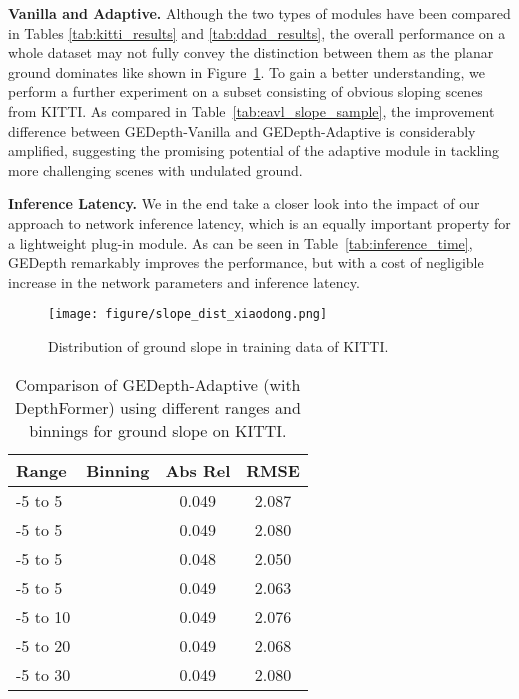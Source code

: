 \documentclass[10pt,twocolumn,letterpaper]{article}
\begin{document}
\noindent\textbf{Vanilla and Adaptive.} 
Although the two types of modules have been compared in Tables \ref{tab:kitti_results} and \ref{tab:ddad_results}, the overall performance on a whole dataset may not fully convey the distinction between them as the planar ground dominates like shown in Figure~\ref{fig:slope_dist}. To gain a better understanding, we perform a further experiment on a subset consisting of obvious sloping scenes from KITTI. As compared in Table~\ref{tab:eavl_slope_sample}, the improvement difference between GEDepth-Vanilla and GEDepth-Adaptive is considerably amplified, suggesting the promising potential of the adaptive module in tackling more challenging scenes with undulated ground.  

\noindent\textbf{Inference Latency.}  
We in the end take a closer look into the impact of our approach to network inference latency, which is an equally important property for a lightweight plug-in module. As can be seen in Table~\ref{tab:inference_time}, GEDepth remarkably improves the performance, but with a cost of negligible increase in the network parameters and inference latency.

\begin{figure}[t]
\centering
\texttt{[image: figure/slope\_dist\_xiaodong.png]}
\caption{
Distribution of ground slope in training data of KITTI.
}
\label{fig:slope_dist}
\end{figure}

\begin{table}
\small
\begin{center}
\begin{tabular}{lccc}
\hline
Range & Binning & Abs Rel  & RMSE  \\
\hline
-5 to 5 &  & 0.049 & 2.087\\
\hline
-5 to 5 &  & 0.049 & 2.080\\
\hline
-5 to 5 &  & 0.048 & 2.050\\
\hline
-5 to 5 &  & 0.049 & 2.063\\
\hline
-5 to 10 &  & 0.049 & 2.076\\
\hline
-5 to 20 &  & 0.049 & 2.068\\
\hline
-5 to 30 &  & 0.049 & 2.080\\
\hline
\end{tabular}
\end{center}
\caption{Comparison of GEDepth-Adaptive (with DepthFormer) using different ranges and binnings for ground slope on KITTI.}
\label{tab:kitti_slope_ablation}
\end{table}
\end{document}
